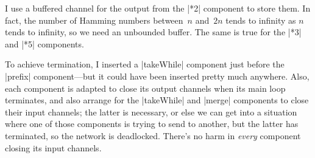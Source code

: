 \begin{answerI}
I use a buffered channel for the output from the |*2| component to store
them.  In fact, the number of Hamming numbers between~$n$ and~$2n$ tends to
infinity as $n$ tends to infinity, so we need an unbounded buffer.  The same
is true for the |*3| and |*5| components. 

To achieve termination, I inserted a |takeWhile| component just before the
|prefix| component---but it could have been inserted pretty much anywhere.
Also, each component is adapted to close its output channels when its main
loop terminates, and also arrange for the |takeWhile| and |merge| components
to close their input channels; the latter is necessary, or else we can get
into a situation where one of those components is trying to send to another,
but the latter has terminated, so the network is deadlocked.  There's no harm
in \emph{every} component closing its input channels.
\end{answerI}
